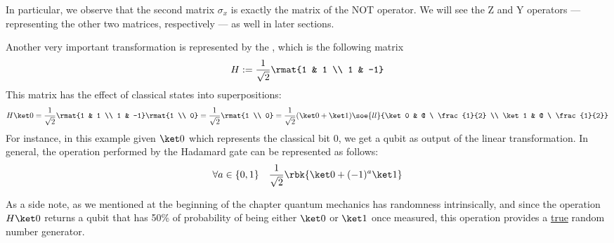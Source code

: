 \documentclass[a4paper, 12pt]{report}
\begin{document}
In particular, we observe that the second matrix $\sigma_x$ is exactly the matrix of the NOT operator. We will see the Z and Y operators --- representing the other two matrices, respectively --- as well in later sections.

Another very important transformation is represented by the , which is the following matrix $$H := \dfrac{1}{\sqrt 2}\rmat{1 & 1 \\ 1 & -1}$$ This matrix has the effect of  classical states into superpositions: $$H \ket 0 = \dfrac{1}{\sqrt 2}\rmat{1 & 1 \\ 1 & -1} \rmat{1 \\ 0} = \dfrac{1}{\sqrt 2} \rmat{1 \\ 0} = \dfrac{1}{\sqrt 2} (\ket 0 + \ket 1) \soe{ll}{\ket 0 & @ \  \frac{1}{2} \\ \ket 1 & @ \  \frac{1}{2}}$$ For instance, in this example given $\ket 0$ which represents the classical bit 0, we get a qubit as output of the linear transformation. In general, the operation performed by the Hadamard gate can be represented as follows: $$\forall a \in \{0, 1\} \quad \dfrac{1}{\sqrt 2} \rbk{\ket 0 + (-1)^a \ket 1}$$

As a side note, as we mentioned at the beginning of the chapter quantum mechanics has randomness intrinsically, and since the operation $H \ket 0$ returns a qubit that has 50\% of probability of being either $\ket 0$ or $\ket 1$ once measured, this operation provides a \underline{true} random number generator.
\end{document}
